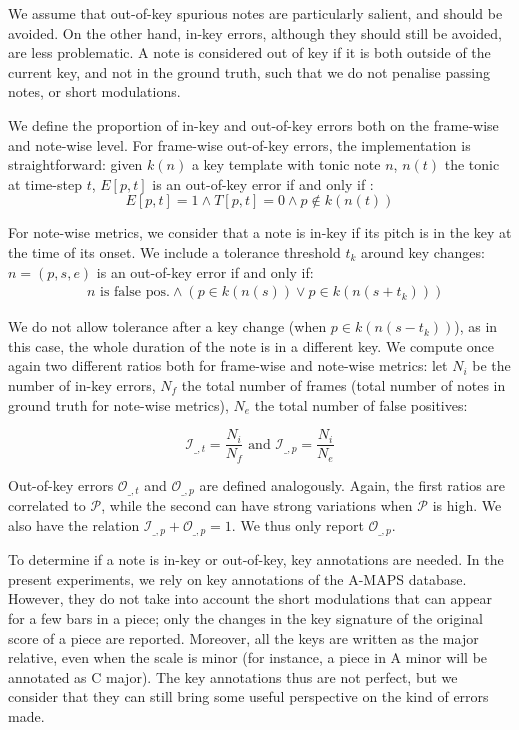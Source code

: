 \documentclass{article}
\begin{document}
We assume that out-of-key spurious notes are particularly salient, and should be avoided. On the other hand, in-key errors, although they should still be avoided, are less problematic. A note is considered out of key if it is both outside of the current key, and not in the ground truth, such that we do not penalise passing notes, or short modulations.

We define the proportion of in-key and out-of-key errors both on the frame-wise and note-wise level.
For frame-wise out-of-key errors, the implementation is straightforward: given $k(n)$ a key template with tonic note $n$, $n(t)$ the tonic at time-step $t$,
$E[p,t]$ is an out-of-key error if and only if :
\vspace{-0.2cm}
\[
E[p,t] = 1 \wedge T[p,t] = 0 \wedge p \notin k(n(t))
\]

\vspace{-0.2cm}
For note-wise metrics, we consider that a note is in-key if its pitch is in the key at the time of its onset. We include a tolerance threshold $t_k$ around key changes: $n=(p,s,e)$ is an out-of-key error
if and only if: 
\vspace{-0.2cm}
\setlength{\jot}{0pt}
\begin{align*}
& n \text{ is false pos.} \wedge (p \in k(n(s)) \vee p \in k(n(s + t_k)))
\end{align*}

\vspace{-0.2cm}
We do not allow tolerance after a key change (when $p \in k(n(s - t_k))$), as in this case, the whole duration of the note is in a different key. We compute once again two different ratios both for frame-wise and note-wise metrics:  
let $N_i$  be the number of in-key errors, $N_f$ the total number of frames (total number of notes in ground truth for note-wise metrics), $N_e$ the total number of false positives:

\vspace{-0.35cm}
\[
\mathcal{I}_{\_,t} = \frac{N_i}{N_f} \textrm{ and } 
\mathcal{I}_{\_,p} = \frac{N_i}{N_e}
\]

\vspace{-0.10cm}
Out-of-key errors $\mathcal{O}_{\_,t}$ and $\mathcal{O}_{\_,p}$ are defined analogously.
Again, the first ratios are correlated to $\mathcal{P}$, while the second can have strong variations when $\mathcal{P}$ is high. 
We also have the relation $\mathcal{I}_{\_,p} + \mathcal{O}_{\_,p} = 1$. We thus only report $\mathcal{O}_{\_,p}$.

To determine if a note is in-key or out-of-key, key annotations are needed.
In the present experiments, we rely on key annotations of the A-MAPS database. 
However, they do not take into account the short modulations that can appear for a few bars in a piece; only the changes in the key signature of the original score of a piece are reported.
Moreover, all the keys are written as the major relative, even when the scale is minor (for instance, a piece in A minor will be annotated as C major).
The key annotations thus are not perfect, but we consider that they can still bring some useful perspective on the kind of errors made.
\end{document}

